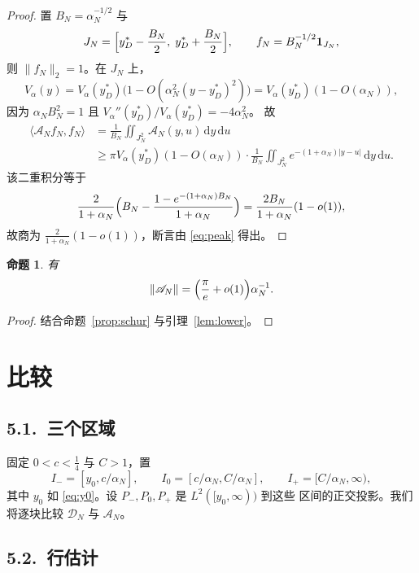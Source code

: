 \documentclass[12pt,a4paper]{amsart}
\numberwithin{equation}{section}
\theoremstyle{plain}
\newtheorem{proposition}[theorem]{命题}
\theoremstyle{definition}
\newcommand{\dd}{\,\mathrm{d}}
\begin{document}
\begin{proof}
置 $B_N=\alpha_N^{-1/2}$ 与
\[
 J_N=\Bigl[y_D^*-\frac{B_N}2,\;y_D^*+\frac{B_N}2\Bigr],
 \qquad f_N=B_N^{-1/2}\mathbf 1_{J_N},
\]
则 $\|f_N\|_2=1$。在 $J_N$ 上，
\[
 V_\alpha(y)=V_\alpha(y_D^*)\bigl(1-O(\alpha_N^2(y-y_D^*)^2)\bigr)
 =V_\alpha(y_D^*)(1-O(\alpha_N)),
\]
因为 $\alpha_NB_N^2=1$ 且 $V_\alpha''(y_D^*)/V_\alpha(y_D^*)=-4\alpha_N^2$。
故
\[
 \begin{aligned}
 \langle\mathscr A_Nf_N,f_N\rangle
 &=\frac1{B_N}\iint_{J_N^2}\mathscr A_N(y,u)\dd y\dd u\\
 &\ge\pi V_\alpha(y_D^*)(1-O(\alpha_N))
 \cdot\frac1{B_N}\iint_{J_N^2}e^{-(1+\alpha_N)|y-u|}\dd y\dd u .
 \end{aligned}
\]
该二重积分等于
\[
 \frac2{1+\alpha_N}\Bigl(B_N-\frac{1-e^{-(1+\alpha_N)B_N}}{1+\alpha_N}\Bigr)
 =\frac{2B_N}{1+\alpha_N}(1-o(1)),
\]
故商为 $\frac{2}{1+\alpha_N}(1-o(1))$，断言由 \eqref{eq:peak} 得出。
\end{proof}

\begin{proposition}\label{prop:modelnorm}
有
\begin{equation}\label{eq:modelnorm}
 \|\mathscr A_N\|=\Bigl(\frac{\pi}{e}+o(1)\Bigr)\alpha_N^{-1}.
\end{equation}
\end{proposition}

\begin{proof}
结合命题~\ref{prop:schur} 与引理~\ref{lem:lower}。
\end{proof}

\section{比较}\label{sec:compare}

\subsection*{5.1.\ 三个区域}

固定 $0<c<\frac14$ 与 $C>1$，置
\begin{equation}\label{eq:regions}
 I_-=[y_0,c/\alpha_N],\qquad I_0=[c/\alpha_N,C/\alpha_N],\qquad
 I_+=[C/\alpha_N,\infty),
\end{equation}
其中 $y_0$ 如 \eqref{eq:y0}。设 $P_-,P_0,P_+$ 是 $L^2([y_0,\infty))$ 到这些
区间的正交投影。我们将逐块比较 $\mathcal D_N$ 与 $\mathscr A_N$。

\subsection*{5.2.\ 行估计}
\end{document}

